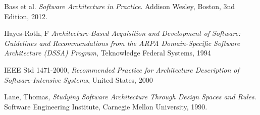 \documentclass{article}
\begin{document}
\begin{comment}
\subsection{A new view on architecture}

From a business perspective one important property is costliness. Business usually want systems with all kinds of fancy additions however if told what those additions would cost they might not consider them as relevant. The view we will propose and explain is therefore a "cost" view. It explains the different possibilities within a module and compares them with costs and different quality attributes in mind. This gives the initiator and the financiers a good grasp of what is possible within a module and what kind of costs are associated with it.

\end{comment}



\begin{thebibliography}{9}

Bass et al.
  \emph{Software Architecture in Practice}.
  Addison Wesley, Boston,
  3nd Edition,
  2012.

 Hayes-Roth, F
 \emph{Architecture-Based Acquisition and Development of Software: Guidelines and Recommendations from the ARPA Domain-Speciﬁc
 Software Architecture (DSSA) Program},
 Teknowledge Federal Systems,
 1994

 IEEE Std 1471-2000,
 \emph{Recommended Practice for Architecture Description of Software-Intensive Systems},
 United States,
 2000

  Lane, Thomas,
  \emph{Studying Software Architecture Through Design Spaces and Rules}.
  Software Engineering Institute, Carnegie Mellon University,
  1990.

\end{thebibliography}
\end{document}
